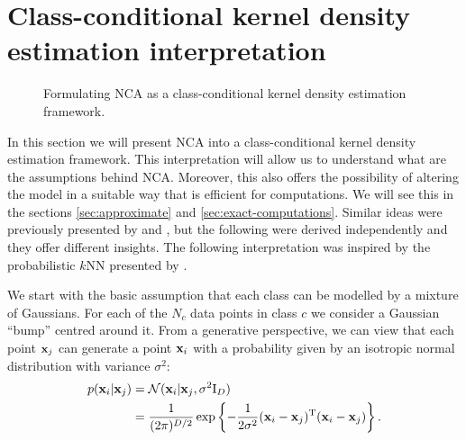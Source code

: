 \section{Class-conditional kernel density estimation interpretation}
\label{sec:cc-kde}
	
	\begin{figure}
	  \centering
	  \caption{Formulating NCA as a class-conditional kernel density estimation
	framework.}
	  \label{fig:kde}
	\end{figure}
	
	In this section we will present NCA into a class-conditional kernel density
	estimation framework. This interpretation will allow us to understand what are
	the assumptions behind NCA. Moreover, this also offers the possibility of
	altering the model in a suitable way that is efficient for computations. We will
	see this in the sections \ref{sec:approximate} and \ref{sec:exact-computations}.
	Similar ideas were previously presented by and , but the following were derived
	independently and they offer different insights. The following interpretation
	was inspired by the probabilistic $k$NN presented by \citet{barber2011}.
	
	We start with the basic assumption that each class can be modelled by a mixture
	of Gaussians. For each of the $N_c$ data points in class $c$ we consider a
	Gaussian ``bump'' centred around it. From a generative perspective, we can view
	that each point $\mathbf{x}_j$ can generate a point $\mathbf{x}_i$ with a probability given by
	an isotropic normal distribution with variance $\sigma^2$:
	\begin{align}
	    p(\mathbf{x}_i|\mathbf{x}_j) &= \mathcal{N}(\mathbf{x}_i|\mathbf{x}_j, \sigma^2\mathrm{I}_D) \\
	                   &= \frac{1}{(2\pi)^{D/2}}\exp \left\{-\frac{1}{2\sigma^2}
	(\mathbf{x}_i - \mathbf{x}_j)^\mathrm{T}(\mathbf{x}_i - \mathbf{x}_j)\right\}.
	\end{align}
	
